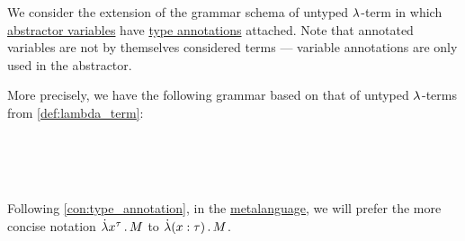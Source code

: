 \begin{definition}\label{def:typed_lambda_term}\mimprovised
  We consider the extension of the grammar schema of untyped \( {\mathrm \lambda} \)-term in which \hyperref[def:lambda_abstractor]{abstractor variables} have \hyperref[con:type_annotation]{type annotations} attached. Note that annotated variables are not by themselves considered terms --- variable annotations are only used in the abstractor.

  More precisely, we have the following grammar based on that of untyped \( {\mathrm \lambda} \)-terms from \cref{def:lambda_term}:
  \begin{bnf*}
     { \bnfsp \bnftsq{:} \bnfsp {}} \\
      {\bnftsq{\( ( \)} \bnfsp {} \bnfsp {} \bnfsp \bnftsq{\( ) \)}} \\
      {\bnftsq{\( ( \)} \bnfsp \bnftsq{\( \synlambda \)} \bnfsp {} \bnfsp {} \bnfsp {} \bnfsp \bnftsq{\( ) \)}} \\
             { \bnfor {} \bnfor {}}
  \end{bnf*}

  Following \cref{con:type_annotation}, in the \hyperref[con:metalanguage]{metalanguage}, we will prefer the more concise notation \( \qabs {x^\tau} M \) to \( \qabs {(x: \tau)} M \).
\end{definition}
